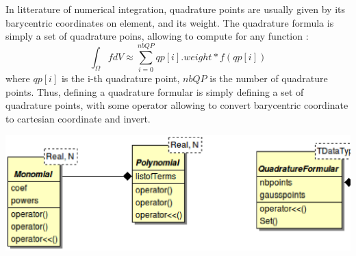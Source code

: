 \documentclass[a4paper,10pt]{article}
\begin{document}
In litterature of numerical integration, quadrature points are usually given by its barycentric coordinates on element, and its weight. The quadrature formula is simply a set of quadrature poins, allowing to compute for any function :
\[
\int_{\Omega} fdV \approx \sum_{i=0}^{nbQP} qp[i].weight*f(qp[i])
\]
where $qp[i]$ is the i-th quadrature point, $nbQP$ is the number of quadrature points. Thus, defining a quadrature formular is simply defining a set of quadrature points, with some operator allowing to convert barycentric coordinate to cartesian coordinate and invert. 
\begin{center}
 \includegraphics[scale=0.5]{diagramToolsFEM}
\end{center}
\end{document}
